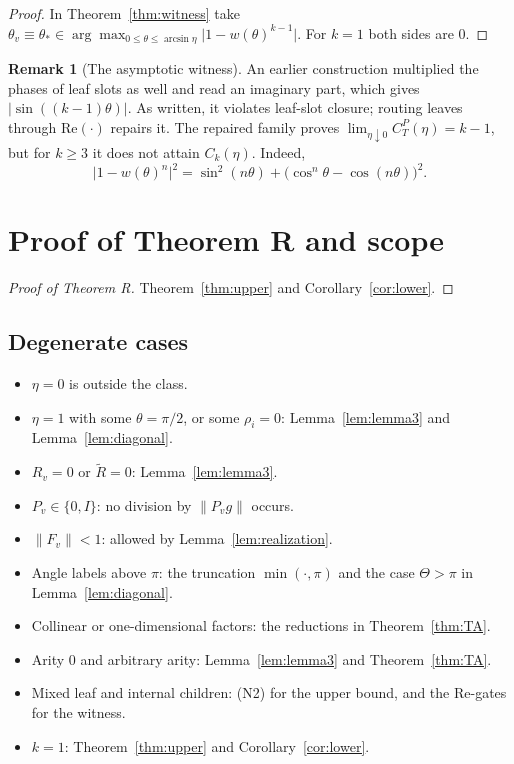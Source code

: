 \documentclass[11pt]{amsart}
\theoremstyle{definition}
\newtheorem*{remark}{Remark}
\newcommand{\norm}[1]{\lVert #1\rVert}
\newcommand{\abs}[1]{\lvert #1\rvert}
\begin{document}
\begin{proof}
In Theorem~\ref{thm:witness} take
$\theta_v\equiv\theta_*\in\arg\max_{0\le\theta\le\arcsin\eta}\abs{1-w(\theta)^{k-1}}$.
For $k=1$ both sides are $0$.
\end{proof}

\begin{remark}[The asymptotic witness]
An earlier construction multiplied the phases of leaf slots as well and read an
imaginary part, which gives $\abs{\sin((k-1)\theta)}$. As written, it violates leaf-slot
closure; routing leaves through $\mathrm{Re}(\cdot)$ repairs it. The repaired family proves
$\lim_{\eta\downarrow0}C^P_T(\eta)=k-1$, but for $k\ge3$ it does not attain $C_k(\eta)$.
Indeed,
\[
\abs{1-w(\theta)^n}^2=\sin^2(n\theta)+\bigl(\cos^n\theta-\cos(n\theta)\bigr)^2.
\]
\end{remark}

\section{Proof of Theorem R and scope}\label{sec:proof}

\begin{proof}[Proof of Theorem R]
Theorem~\ref{thm:upper} and Corollary~\ref{cor:lower}.
\end{proof}

\subsection*{Degenerate cases}
\begin{itemize}
\item $\eta=0$ is outside the class.
\item $\eta=1$ with some $\theta=\pi/2$, or some $\rho_i=0$: Lemma~\ref{lem:lemma3} and
  Lemma~\ref{lem:diagonal}.
\item $R_v=0$ or $\tilde R=0$: Lemma~\ref{lem:lemma3}.
\item $P_v\in\{0,I\}$: no division by $\norm{P_vg}$ occurs.
\item $\norm{F_v}<1$: allowed by Lemma~\ref{lem:realization}.
\item Angle labels above $\pi$: the truncation $\min(\cdot,\pi)$ and the case
  $\Theta>\pi$ in Lemma~\ref{lem:diagonal}.
\item Collinear or one-dimensional factors: the reductions in Theorem~\ref{thm:TA}.
\item Arity $0$ and arbitrary arity: Lemma~\ref{lem:lemma3} and Theorem~\ref{thm:TA}.
\item Mixed leaf and internal children: (N2) for the upper bound, and the
  $\mathrm{Re}$-gates for the witness.
\item $k=1$: Theorem~\ref{thm:upper} and Corollary~\ref{cor:lower}.
\end{itemize}
\end{document}
